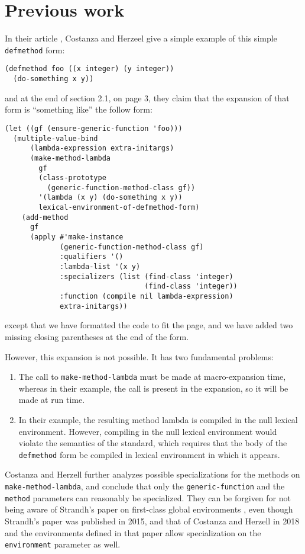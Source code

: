 \section{Previous work}

In their article \cite{Constanza:2008}, Costanza and Herzeel give a
simple example of this simple \texttt{defmethod} form:

\begin{verbatim}
(defmethod foo ((x integer) (y integer))
  (do-something x y))
\end{verbatim}

\noindent
and at the end of section 2.1, on page 3, they claim that the
expansion of that form is ``something like'' the follow form:

{\small\begin{verbatim}
(let ((gf (ensure-generic-function 'foo)))
  (multiple-value-bind
      (lambda-expression extra-initargs)
      (make-method-lambda
        gf
        (class-prototype
          (generic-function-method-class gf))
        '(lambda (x y) (do-something x y))
        lexical-environment-of-defmethod-form)
    (add-method
      gf
      (apply #'make-instance
             (generic-function-method-class gf)
             :qualifiers '()
             :lambda-list '(x y)
             :specializers (list (find-class 'integer)
                                 (find-class 'integer))
             :function (compile nil lambda-expression)
             extra-initargs))
\end{verbatim}}

\noindent
except that we have formatted the code to fit the page, and we have
added two missing closing parentheses at the end of the form.

However, this expansion is not possible.  It has two fundamental
problems:

\begin{enumerate}
\item The call to \texttt{make-method-lambda} must be made at
  macro-expansion time, whereas in their example, the call is present
  in the expansion, so it will be made at run time.
\item In their example, the resulting method lambda is compiled in the
  null lexical environment.  However, compiling in the null lexical
  environment would violate the semantics of the \commonlisp{}
  standard, which requires that the body of the \texttt{defmethod}
  form be compiled in lexical environment in which it appears.
\end{enumerate}

Costanza and Herzell further analyzes possible specializations for the
methods on \texttt{make-method-lambda}, and conclude that only the
\texttt{generic-function} and the \texttt{method} parameters can
reasonably be specialized.  They can be forgiven for not being aware
of Strandh's paper on first-class global environments
\cite{Strandh:2015:ELS:Environments}, even though Strandh's paper was
published in 2015, and that of Costanza and Herzell in 2018 and the
environments defined in that paper allow specialization on the
\texttt{environment} parameter as well.
